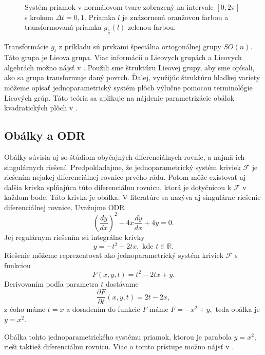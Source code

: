 \begin{example}
\begin{figure}[h]
	\caption[Systém priamok v normálovom tvare.]{Systém priamok v normálovom tvare zobrazený na intervale $[0, 2\pi]$ s krokom $\Delta t = 0,1$. Priamka $l$ je znázornená oranžovou farbou a transformovaná priamka $g_{\frac{\pi}{2}}(l)$ zelenou farbou.}
	\label{fig:lines_in_normal_form}
\end{figure}
\end{example}

Transformácie $g_{t}$ z príkladu sú prvkami špeciálna ortogonálnej grupy $SO(n)$. Táto grupa je Lieova grupa. Viac informácií o Lieovych grupách a Lieovych algebrách možno nájsť v \cite{Lee12}.
Použili sme štruktúru Lieovej grupy, aby sme opísali, ako sa grupa transformuje daný povrch. Ďalej, využijúc štruktúru hladkej variety môžeme opísať jednoparametrický systém plôch výlučne pomocou terminológie Lieových grúp. Táto teória sa aplikuje na nájdenie parametrizácie obálok kvadratických plôch v \cite{Vra22}. 

\subsection{Obálky a ODR}
Obálky súvisia aj so štúdiom obyčajných diferenciálnych rovníc, a najmä ich singulárnych riešení. Predpokladajme, že jednoparametrický systém kriviek $\mathcal{F}$ je riešením nejakej diferenciálnej rovnice prvého rádu. Potom môže existovať aj ďalšia krivka spĺňajúca túto diferenciálnu rovnicu, ktorá je dotyčnicou k $\mathcal{F}$ v každom bode. Táto krivka je obálka. V literatúre sa nazýva aj singulárne riešenie diferenciálnej rovnice.
Uvažujme ODR 
$$
\left(\frac{dy}{dx}\right)^2 - 4x\frac{dy}{dx} + 4y = 0.
$$
Jej regulárnym riešením sú integrálne krivky 
$$ y = - t^2 + 2tx, \text{ kde } t \in \mathbb{R}.$$
Riešenie môžeme reprezentovať ako jednoparametrický systém kriviek $\mathcal{F}$ s funkciou
$$F(x,y,t) = t^2 - 2tx + y. $$
Derivovaním podľa parametra $t$ dostávame
$$\dfrac{\partial F}{\partial t} (x,y,t) = 2t - 2x, $$
z čoho máme $t=x$ a dosadením do funkcie $F$ máme $F=-x^2+y,$ teda obálka je $y=x^2.$

Obálka tohto jednoparametrického systému priamok, ktorou je parabola $y = x^2$, rieši taktiež diferenciálnu rovnicu. Viac o tomto prístupe možno nájsť v \cite{Gro97}.

